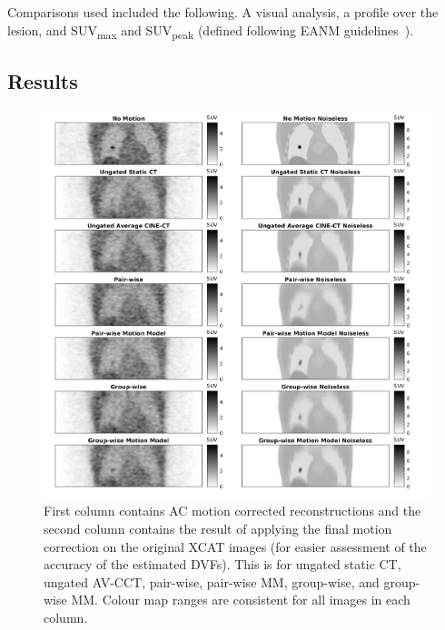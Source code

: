                 Comparisons used included the following. A visual analysis, a profile over the lesion, and \gls{SUV}\textsubscript{max} and \gls{SUV}\textsubscript{peak} (defined following \gls{EANM} guidelines~\parencite{Boellaard2015FDG2.0}).
        
        \subsection{Results} \label{sec:comparison_of_motion_correction_methods_incorporating_motion_modelling_for_pet_ct_using_a_single_breath_hold_attenuation_map_results}
            \begin{figure}
                \centering
                
                \includegraphics[width=1.0\linewidth]{figures/motion_correction_1_results_3_visual_analysis.png}
                
                \captionsetup{singlelinecheck=false}
                \caption{
                    First column contains \gls{AC} motion corrected reconstructions and the second column contains the result of applying the final motion correction on the original \gls{XCAT} images (for easier assessment of the accuracy of the estimated \glspl{DVF}). This is for ungated static \gls{CT}, ungated \gls{AV-CCT}, pair-wise, pair-wise \gls{MM}, group-wise, and group-wise \gls{MM}. Colour map ranges are consistent for all images in each column.
                }
                \label{fig:comparison_of_motion_correction_methods_incorporating_motion_modelling_for_pet_ct_using_a_single_breath_hold_attenuation_map_results_visual_analysis}
            \end{figure}
            
